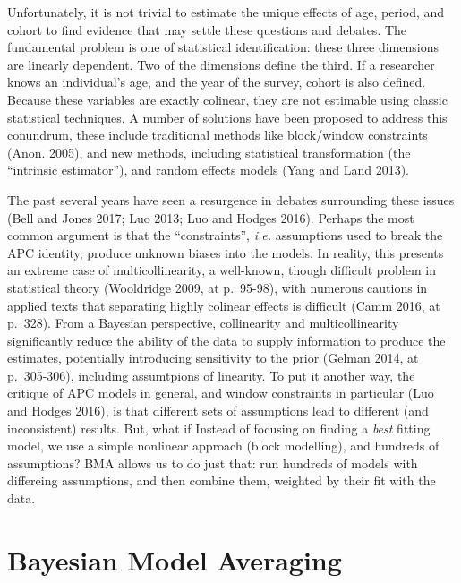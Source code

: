 \documentclass[]{article}
\begin{document}
Unfortunately, it is not trivial to estimate the unique effects of age,
period, and cohort to find evidence that may settle these questions and
debates. The fundamental problem is one of statistical identification:
these three dimensions are linearly dependent. Two of the dimensions
define the third. If a researcher knows an individual's age, and the
year of the survey, cohort is also defined. Because these variables are
exactly colinear, they are not estimable using classic statistical
techniques. A number of solutions have been proposed to address this
conundrum, these include traditional methods like block/window
constraints (Anon. 2005), and new methods, including statistical
transformation (the ``intrinsic estimator''), and random effects models
(Yang and Land 2013).

The past several years have seen a resurgence in debates surrounding
these issues (Bell and Jones 2017; Luo 2013; Luo and Hodges 2016).
Perhaps the most common argument is that the ``constraints'',
\emph{i.e.} assumptions used to break the APC identity, produce unknown
biases into the models. In reality, this presents an extreme case of
multicollinearity, a well-known, though difficult problem in statistical
theory (Wooldridge 2009, at p.~95-98), with numerous cautions in applied
texts that separating highly colinear effects is difficult (Camm 2016,
at p.~328). From a Bayesian perspective, collinearity and
multicollinearity significantly reduce the ability of the data to supply
information to produce the estimates, potentially introducing
sensitivity to the prior (Gelman 2014, at p.~305-306), including
assumtpions of linearity. To put it another way, the critique of APC
models in general, and window constraints in particular (Luo and Hodges
2016), is that different sets of assumptions lead to different (and
inconsistent) results. But, what if Instead of focusing on finding a
\emph{best} fitting model, we use a simple nonlinear approach (block
modelling), and hundreds of assumptions? BMA allows us to do just that:
run hundreds of models with differeing assumptions, and then combine
them, weighted by their fit with the data.

\section{Bayesian Model Averaging}\label{bayesian-model-averaging}
\end{document}
